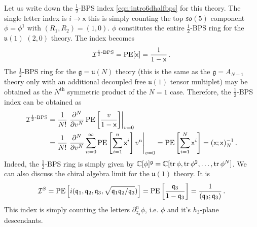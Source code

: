 \documentclass[main.tex]{subfiles}
\begin{document}
Let us write down the $\frac{1}{2}$-BPS index \eqref{eqn:intro6dhalfbps} for this theory.  The single letter index is $i\to\mathsf{x}$ this is simply counting the top $\mathfrak{so}(5)$ component $\phi=\phi^1$ with $(R_1,R_2)=(1,0)$.  $\phi$ constitutes the entire $\frac{1}{2}$-BPS ring for the $\mathfrak{u}(1)$ $(2,0)$ theory.  The index becomes
\begin{equation}
\mathcal{I}^{\text{$\frac{1}{2}$-BPS}}=\operatorname{\mathrm{PE}}[\mathsf{x}]=\frac{1}{1-\mathsf{x}}\,.
\end{equation}
The $\frac{1}{2}$-BPS ring for the $\mathfrak{g}=\mathfrak{u}(N)$ theory (this is the same as the $\mathfrak{g}=A_{N-1}$ theory only with an additional decoupled free $\mathfrak{u}(1)$ tensor multiplet) may be obtained as the $N^{\text{th}}$ symmetric product of the $N=1$ case.  Therefore, the $\frac{1}{2}$-BPS index can be obtained as
\begin{equation}
\begin{aligned}\label{eqn:12bps6dpart}
\mathcal{I}^{\text{$\frac{1}{2}$-BPS}}&=\frac{1}{N!}\left.\frac{\partial^N}{\partial v^N}\operatorname{\mathrm{PE}}\left[\frac{v}{1-\mathsf{x}}\right]\right|_{v=0}\\
&=\frac{1}{N!}\left.\frac{\partial^N}{\partial v^N}\sum_{n=0}^{\infty}\operatorname{\mathrm{PE}}\left[\sum_{i=1}^n\mathsf{x}^i\right]v^n\right|_{v=0}=\operatorname{\mathrm{PE}}\left[\sum_{i=1}^N\mathsf{x}^i\right]=(\mathsf{x};\mathsf{x})_N^{-1}\,.
\end{aligned}
\end{equation}
Indeed, the $\frac{1}{2}$-BPS ring is simply given by $\mathbb{C}[\phi]^{\mathfrak{g}}=\mathbb{C}[\operatorname{tr}\phi,\operatorname{tr}\phi^2,\dots,\operatorname{tr}\phi^N]$.
We can also discuss the chiral algebra limit for the $\mathfrak{u}(1)$ theory.  It is
\begin{equation}
\mathcal{I}^S=\operatorname{\mathrm{PE}}\left[i(\mathfrak{q}_1,\mathfrak{q}_2,\mathfrak{q}_3,\sqrt{\mathfrak{q}_1\mathfrak{q}_2/\mathfrak{q}_3})\right]=\operatorname{\mathrm{PE}}\left[\frac{\mathfrak{q}_3}{1-\mathfrak{q}_3}\right]=\frac{1}{(\mathfrak{q}_3;\mathfrak{q}_3)}\,.
\end{equation} 
This index is simply counting the letters $\partial_{z_3}^n\phi$, i.e.  $\phi$ and it's $h_3$-plane descendants.
\end{document}

